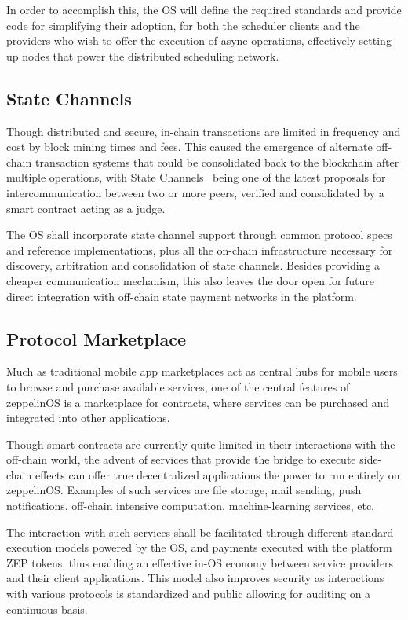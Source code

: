 \documentclass[]{article}
\makeatletter
\DeclareRobustCommand{\_}{%
  \leavevmode\vbox{%
    \hrule\@width.5em
          \@height-.26ex
          \@depth\dimexpr.26ex+.28pt\relax}}
\makeatother
\begin{document}
In order to accomplish this, the OS will define the required standards
and provide code for simplifying their adoption, for both the scheduler
clients and the providers who wish to offer the execution of async
operations, effectively setting up nodes that power the distributed
scheduling network.

\subsection{State Channels}

Though distributed and secure, in-chain transactions are limited in
frequency and cost by block mining times and fees. This caused the
emergence of alternate off-chain transaction systems that could be
consolidated back to the blockchain after multiple operations, with
State Channels~\cite{statechan} being one of the latest proposals for
intercommunication between two or more peers, verified and consolidated
by a smart contract acting as a judge.

The OS shall incorporate state channel support through common protocol
specs and reference implementations, plus all the on-chain
infrastructure necessary for discovery, arbitration and consolidation of
state channels. Besides providing a cheaper communication mechanism,
this also leaves the door open for future direct integration with
off-chain state payment networks in the platform.

\subsection{Protocol Marketplace}

Much as traditional mobile app marketplaces act as central hubs for
mobile users to browse and purchase available services, one of the
central features of zeppelinOS is a marketplace for contracts, where
services can be purchased and integrated into other applications.

Though smart contracts are currently quite limited in their
interactions with the off-chain world, the advent of services that
provide the bridge to execute side-chain effects can offer true
decentralized applications the power to run entirely on zeppelinOS.
Examples of such services are file storage, mail sending, push
notifications, off-chain intensive computation, machine-learning
services, etc.

The interaction with such services shall be facilitated through
different standard execution models powered by the OS, and payments
executed with the platform ZEP tokens, thus enabling an effective
in-OS economy between service providers and their client applications.
This model also improves security as interactions with various protocols
is standardized and public allowing for auditing on a continuous basis.
\end{document}
